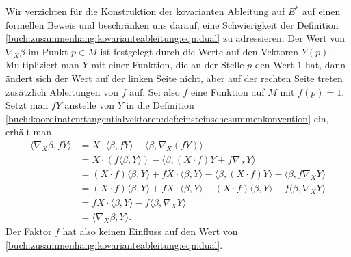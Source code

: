 Wir verzichten für die Konstruktion der kovarianten Ableitung auf $E^*$
auf einen formellen Beweis und beschränken uns darauf, eine Schwierigkeit
der Definition \eqref{buch:zusammenhang:kovarianteableitung:eqn:dual}
zu adressieren.
Der Wert von $\nabla_X\beta$ im Punkt $p\in M$ ist festgelegt durch
die Werte auf den Vektoren $Y(p)$.
Multipliziert man $Y$ mit einer Funktion, die an der Stelle $p$ den Wert
$1$ hat, dann ändert sich der Wert auf der linken Seite nicht, aber
auf der rechten Seite treten zusätzlich Ableitungen von $f$ auf.
Sei also $f$ eine Funktion auf $M$ mit $f(p)=1$.
Setzt man $fY$ anstelle von $Y$ in die Definition
\eqref{buch:koordinaten:tangentialvektoren:def:einsteinschesummenkonvention}
ein, erhält man
\begin{align*}
\langle
\nabla_X \beta,fY
\rangle
&=
X\cdot\langle \beta,fY\rangle
-
\langle \beta,\nabla_X(fY)\rangle
\\
&=
X\cdot(f\langle \beta,Y\rangle)
-
\langle \beta,
(X\cdot f)Y
+
f\nabla_XY
\rangle
\\
&=
(X\cdot f)\langle \beta,Y\rangle
+
fX\cdot \langle \beta,Y\rangle
-
\langle \beta,
(X\cdot f)Y
\rangle
-
\langle \beta,
f\nabla_XY
\rangle
\\
&=
(X\cdot f)
\langle \beta,Y\rangle
+
f X\cdot \langle \beta,Y\rangle
-
(X\cdot f) \langle \beta, Y \rangle
-
f\langle \beta, \nabla_XY \rangle
\\
&=
f X\cdot \langle \beta,Y\rangle
-
f\langle \beta, \nabla_XY \rangle
\\
&=
\langle \nabla_X\beta,Y\rangle.
\end{align*}
Der Faktor $f$ hat also keinen Einfluss auf den Wert von
\eqref{buch:zusammenhang:kovarianteableitung:eqn:dual}.

